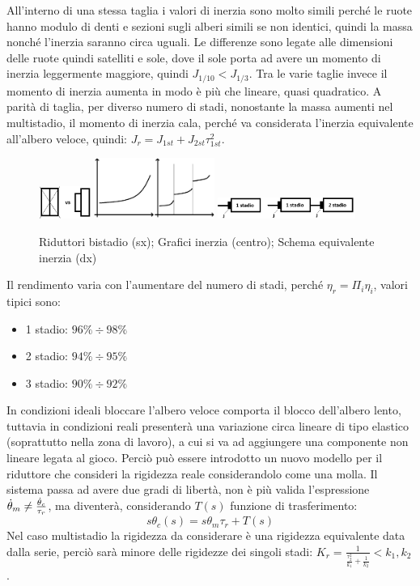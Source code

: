 All'interno di una stessa taglia i valori di inerzia sono molto simili perché le ruote hanno modulo di denti e sezioni sugli alberi simili se non identici, quindi la massa nonché l'inerzia saranno circa uguali.
Le differenze sono legate alle dimensioni delle ruote quindi satelliti e sole, dove il sole porta ad avere un momento di inerzia leggermente maggiore, quindi $J_{1/10}<J_{1/3}$.
Tra le varie taglie invece il momento di inerzia aumenta in modo è più che lineare, quasi quadratico.
A parità di taglia, per diverso numero di stadi, nonostante la massa aumenti nel multistadio, il momento di inerzia cala, perché va considerata l'inerzia equivalente all'albero veloce, quindi: $J_r=J_{1st}+J_{2st}\tau_{1st}^2$.

\begin{figure}[h]
    \centering
    \includegraphics[width=0.15\textwidth]{Immagini/ridutt_2st_diff_dim.png}
    \includegraphics[width=0.35\textwidth]{Immagini/momento_inerzia_stadi.png}
    \includegraphics[width=0.4\textwidth]{Immagini/momento_inerzia_albero_veloce.png}
    \caption{Riduttori bistadio (sx); Grafici inerzia (centro); Schema equivalente inerzia (dx)}
\end{figure}

Il rendimento varia con l'aumentare del numero di stadi, perché $\eta_r=\Pi_i \eta_i$, valori tipici sono:
\begin{itemize}
    \item 1 stadio: $96\% \div 98\%$
    \item 2 stadio: $94\% \div 95\%$
    \item 3 stadio: $90\% \div 92\%$
\end{itemize}

In condizioni ideali bloccare l'albero veloce comporta il blocco dell'albero lento, tuttavia in condizioni reali presenterà una variazione circa lineare di tipo elastico (soprattutto nella zona di lavoro), a cui si va ad aggiungere una componente non lineare legata al gioco.
Perciò può essere introdotto un nuovo modello per il riduttore che consideri la rigidezza reale considerandolo come una molla.
Il sistema passa ad avere due gradi di libertà, non è più valida l'espressione $\dot{\theta}_m \neq \frac{\dot{\theta}_c}{\tau_r}$, ma diventerà, considerando $T(s)$ funzione di trasferimento:
\[s \theta_c(s)=s \theta_m \tau_r + T(s)\]
Nel caso multistadio la rigidezza da considerare è una rigidezza equivalente data dalla serie, perciò sarà minore delle rigidezze dei singoli stadi: $K_r=\frac{1}{\frac{\tau_2^2}{k_1}+\frac{1}{k_2}}<k_1,k_2$.

